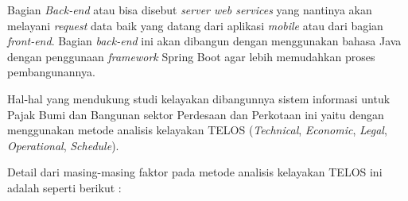 \documentclass[pdftex,12pt, oneside]{article}
\begin{document}
Bagian \textit{Back-end} atau bisa disebut \textit{server web services} yang nantinya akan melayani \textit{request} data baik yang datang dari aplikasi \textit{mobile} atau dari bagian \textit{front-end}. Bagian \textit{back-end} ini akan dibangun dengan menggunakan bahasa Java dengan penggunaan \textit{framework} Spring Boot agar lebih memudahkan proses pembangunannya.

Hal-hal yang mendukung studi kelayakan dibangunnya sistem informasi untuk Pajak Bumi dan Bangunan sektor Perdesaan dan Perkotaan ini yaitu dengan menggunakan metode analisis kelayakan TELOS (\textit{Technical}, \textit{Economic}, \textit{Legal}, \textit{Operational}, \textit{Schedule}).

Detail dari masing-masing faktor pada metode analisis kelayakan TELOS ini adalah seperti berikut :
\end{document}
